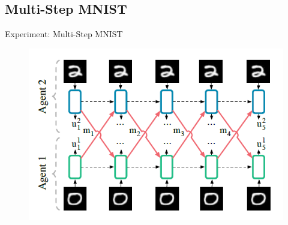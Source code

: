 \documentclass[mathserif]{beamer}
\begin{document}
\subsection{Multi-Step MNIST}
\begin{frame}{Experiment: Multi-Step MNIST}
  \begin{figure}
    \centering
    \includegraphics[scale=0.8]{fig/8}
  \end{figure}
\end{frame}
\end{document}
